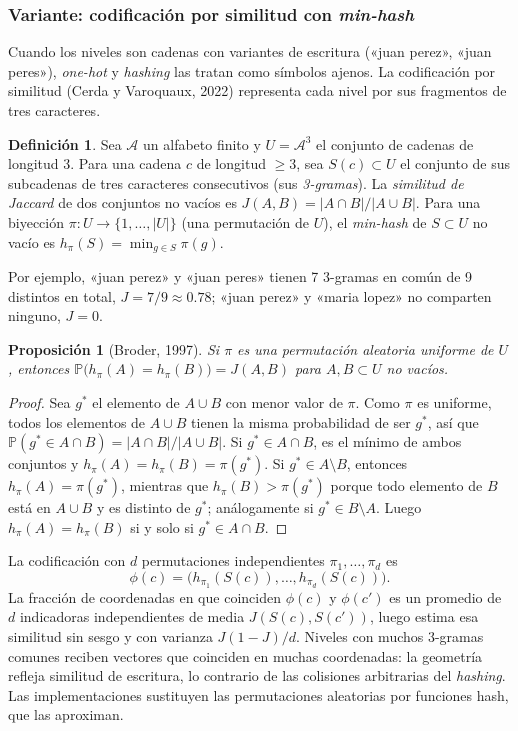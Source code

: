 \documentclass[11pt,a4paper]{article}
\theoremstyle{plain}
\newtheorem{proposicion}[teorema]{Proposición}
\theoremstyle{definition}
\newtheorem{definicion}[teorema]{Definición}
\theoremstyle{remark}
\newcommand{\Prob}{\mathbb{P}}
\newcommand{\1}{\mathbf{1}}
\begin{document}
\subsubsection*{Variante: codificación por similitud con \emph{min-hash}}

Cuando los niveles son cadenas con variantes de escritura («juan perez»,
«juan peres»), \emph{one-hot} y \emph{hashing} las tratan como símbolos
ajenos. La codificación por similitud (Cerda y Varoquaux, 2022) representa
cada nivel por sus fragmentos de tres caracteres.

\begin{definicion}
Sea $\mathcal A$ un alfabeto finito y $U=\mathcal A^3$ el conjunto de
cadenas de longitud 3. Para una cadena $c$ de longitud $\ge3$, sea
$S(c)\subset U$ el conjunto de sus subcadenas de tres caracteres
consecutivos (sus \emph{3-gramas}). La \emph{similitud de Jaccard} de dos
conjuntos no vacíos es $J(A,B)=|A\cap B|/|A\cup B|$. Para una biyección
$\pi:U\to\{1,\dots,|U|\}$ (una permutación de $U$), el \emph{min-hash} de
$S\subset U$ no vacío es $h_\pi(S)=\min_{g\in S}\pi(g)$.
\end{definicion}

Por ejemplo, «juan perez» y «juan peres» tienen 7 3-gramas en común de 9
distintos en total, $J=7/9\approx0.78$; «juan perez» y «maria lopez» no
comparten ninguno, $J=0$.

\begin{proposicion}[Broder, 1997]\label{prop:minhash}
Si $\pi$ es una permutación aleatoria uniforme de $U$, entonces
$\Prob\bigl(h_\pi(A)=h_\pi(B)\bigr)=J(A,B)$ para $A,B\subset U$ no vacíos.
\end{proposicion}

\begin{proof}
Sea $g^*$ el elemento de $A\cup B$ con menor valor de $\pi$. Como $\pi$ es
uniforme, todos los elementos de $A\cup B$ tienen la misma probabilidad de
ser $g^*$, así que $\Prob(g^*\in A\cap B)=|A\cap B|/|A\cup B|$. Si $g^*\in
A\cap B$, es el mínimo de ambos conjuntos y $h_\pi(A)=h_\pi(B)=\pi(g^*)$.
Si $g^*\in A\setminus B$, entonces $h_\pi(A)=\pi(g^*)$, mientras que
$h_\pi(B)>\pi(g^*)$ porque todo elemento de $B$ está en $A\cup B$ y es
distinto de $g^*$; análogamente si $g^*\in B\setminus A$. Luego
$h_\pi(A)=h_\pi(B)$ si y solo si $g^*\in A\cap B$.
\end{proof}

La codificación con $d$ permutaciones independientes
$\pi_1,\dots,\pi_d$ es
\[
\phi(c)=\bigl(h_{\pi_1}(S(c)),\dots,h_{\pi_d}(S(c))\bigr).
\]
La fracción
de coordenadas en que coinciden $\phi(c)$ y $\phi(c')$ es un promedio de
$d$ indicadoras independientes de media $J(S(c),S(c'))$, luego estima esa
similitud sin sesgo y con varianza $J(1-J)/d$. Niveles con muchos 3-gramas
comunes reciben vectores que coinciden en muchas coordenadas: la geometría
refleja similitud de escritura, lo contrario de las colisiones arbitrarias
del \emph{hashing}. Las implementaciones sustituyen las permutaciones
aleatorias por funciones hash, que las aproximan.
\end{document}
